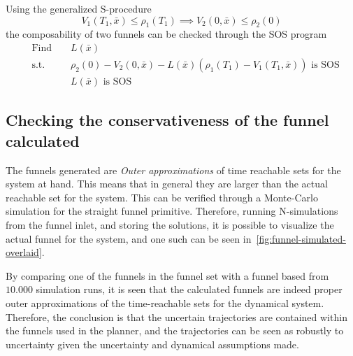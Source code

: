 Using the generalized S-procedure
\begin{equation}
  V_1(T_1,\bar{x}) \leq \rho_1(T_1) \implies V_2(0, \bar{x}) \leq \rho_2(0)
\end{equation}
the composability of two funnels can be checked through the \ac{SOS} program
\begin{align}
    & \text{Find } && L(\bar{x}) \\
    & \text{s.t. } && \rho_2(0) - V_2(0,\bar{x}) - L(\bar{x})\left( \rho_1(T_1) - V_1(T_1,\bar{x}) \right) \text{ is SOS} \nonumber \\ 
    &&& L(\bar{x}) \text{ is SOS} \nonumber
\end{align}

\subsection{Checking the conservativeness of the funnel calculated}

The funnels generated are \textit{Outer approximations} of time reachable sets
for the system at hand. This means that in general they are larger than the
actual reachable set for the system. This can be verified through a Monte-Carlo
simulation for the straight funnel primitive. Therefore, running N-simulations
from the funnel inlet, and storing the solutions, it is possible to visualize
the actual funnel for the system, and one such can be seen
in~\ref{fig:funnel-simulated-overlaid}.

By comparing one of the funnels in the funnel set with a funnel based from
\(10.000\) simulation runs, it is seen that the calculated funnels are indeed
proper outer approximations of the time-reachable sets for the dynamical system.
Therefore, the conclusion is that the uncertain trajectories are contained
within the funnels used in the planner, and the trajectories can be seen as
robustly to uncertainty given the uncertainty and dynamical assumptions made.

